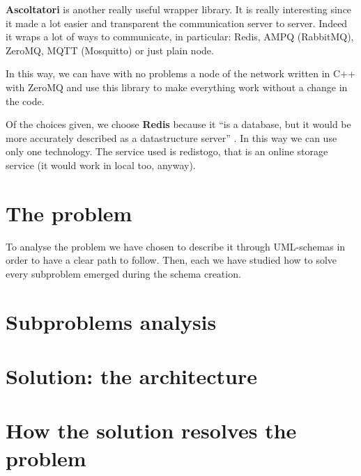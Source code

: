 \textbf{Ascoltatori} is another really useful wrapper library. It is really interesting since it made a lot easier and transparent the communication server to server. Indeed it wraps a lot of ways to communicate, in particular: Redis, AMPQ (RabbitMQ), ZeroMQ, MQTT (Mosquitto) or just plain node.

In this way, we can have with no problems a node of the network written in C++ with ZeroMQ and use this library to make everything work without a change in the code.

Of the choices given, we choose \textbf{Redis} because it ``is a database, but it would be more accurately described as a datastructure server'' \cite{book:smashing}. In this way we can use only one technology. The service used is redistogo, that is an online storage service (it would work in local too, anyway).

\section{The problem}

To analyse the problem we have chosen to describe it through UML-schemas in order to have a clear path to follow. Then, each we have studied how to solve every subproblem emerged during the schema creation.

\section{Subproblems analysis}

\section{Solution: the architecture}

\section{How the solution resolves the problem}





